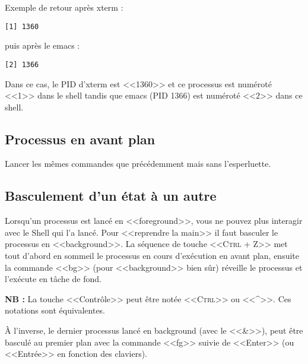 \documentclass[11pt]{article}
\begin{document}
Exemple de retour après xterm :

\begin{lstlisting}
[1] 1360
\end{lstlisting}

puis après le emacs :

\begin{lstlisting}
[2] 1366
\end{lstlisting}

Dans ce cas, le PID d'xterm est <<1360>> et ce processus est numéroté <<1>> dans le shell tandis que emacs (PID 1366) est numéroté <<2>> dans ce shell.

\subsection{Processus en avant plan}

Lancer les mêmes commandes que précédemment mais sans l'esperluette.

\subsection{Basculement d’un état à un autre}

Lorsqu’un processus est lancé en <<foreground>>, vous ne pouvez plus interagir avec le Shell qui l’a lancé.
Pour <<reprendre la main>> il faut basculer le processus en <<background>>.
La séquence de touche \textsc{<<Ctrl + Z>>} met tout d'abord en sommeil le processus en cours d'exécution en avant plan, ensuite la commande <<bg>> (pour <<background>> bien sûr) réveille le processus et l'exécute en tâche de fond.

\textbf{NB :} La touche <<Contrôle>> peut être notée <<\textsc{Ctrl}>> ou <<\^{}>>. Ces notations sont équivalentes.

À l'inverse, le dernier processus lancé en background (avec le <<\&>>), peut être basculé au premier plan avec la commande <<fg>> suivie de <<Enter>> (ou <<Entrée>> en fonction des claviers).
\end{document}
